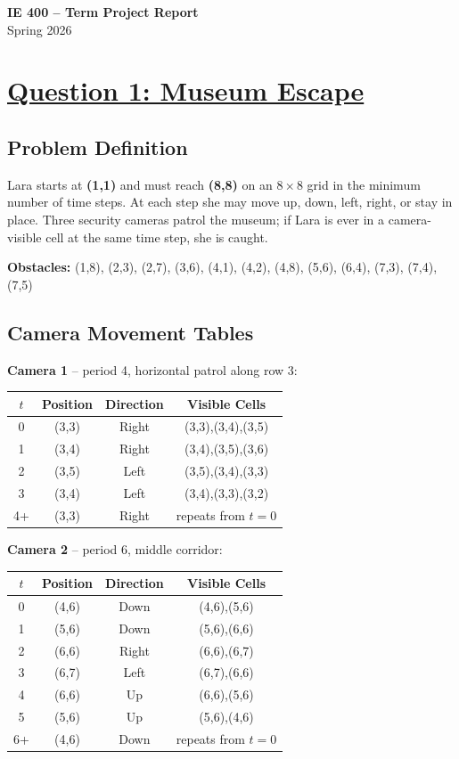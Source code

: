 \documentclass[12pt,a4paper]{article}
\begin{document}
\begin{center}
{\Large\textbf{IE 400 -- Term Project Report}}\\[4pt]
Spring 2026
\end{center}

\bigskip

\section*{\underline{Question 1: Museum Escape}}

\subsection*{Problem Definition}

Lara starts at \textbf{(1,1)} and must reach \textbf{(8,8)} on an $8\times8$ grid in the
minimum number of time steps. At each step she may move up, down, left, right, or stay in
place. Three security cameras patrol the museum; if Lara is ever in a camera-visible cell at
the same time step, she is caught.

\textbf{Obstacles:} (1,8), (2,3), (2,7), (3,6), (4,1), (4,2), (4,8), (5,6), (6,4),
(7,3), (7,4), (7,5)

\subsection*{Camera Movement Tables}

\textbf{Camera 1} -- period 4, horizontal patrol along row 3:

\begin{tabular}{cccc}
\toprule
$t$ & Position & Direction & Visible Cells \\
\midrule
0   & (3,3) & Right & (3,3),(3,4),(3,5) \\
1   & (3,4) & Right & (3,4),(3,5),(3,6) \\
2   & (3,5) & Left  & (3,5),(3,4),(3,3) \\
3   & (3,4) & Left  & (3,4),(3,3),(3,2) \\
4+  & (3,3) & Right & repeats from $t=0$ \\
\bottomrule
\end{tabular}

\medskip
\textbf{Camera 2} -- period 6, middle corridor:

\begin{tabular}{cccc}
\toprule
$t$ & Position & Direction & Visible Cells \\
\midrule
0  & (4,6) & Down  & (4,6),(5,6) \\
1  & (5,6) & Down  & (5,6),(6,6) \\
2  & (6,6) & Right & (6,6),(6,7) \\
3  & (6,7) & Left  & (6,7),(6,6) \\
4  & (6,6) & Up    & (6,6),(5,6) \\
5  & (5,6) & Up    & (5,6),(4,6) \\
6+ & (4,6) & Down  & repeats from $t=0$ \\
\bottomrule
\end{tabular}
\end{document}
